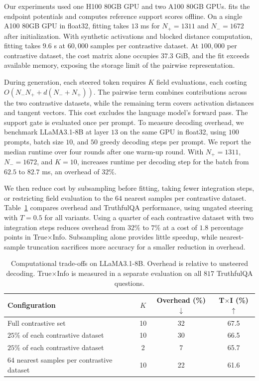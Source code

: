 Our experiments used one H100 80GB GPU and two A100 80GB GPUs. \Cobras fits the endpoint potentials and computes reference support scores offline. On a single A100 80GB GPU in float32, fitting takes $13$ ms for $N_+=1311$ and $N_-=1672$ after initialization. With synthetic activations and blocked distance computation, fitting takes $9.6$ s at $60{,}000$ samples per contrastive dataset. At $100{,}000$ per contrastive dataset, the cost matrix alone occupies $37.3$ GiB, and the fit exceeds available memory, exposing the storage limit of the pairwise representation.

During generation, each steered token requires $K$ field evaluations, each costing $O(N_-N_+ + d(N_-+N_+))$. The pairwise term combines contributions across the two contrastive datasets, while the remaining term covers activation distances and tangent vectors. This cost excludes the language model's forward pass. The support gate is evaluated once per prompt. To measure decoding overhead, we benchmark LLaMA3.1-8B at layer $13$ on the same GPU in float32, using $100$ prompts, batch size $10$, and $50$ greedy decoding steps per prompt. We report the median runtime over four rounds after one warm-up round. With $N_+=1311$, $N_-=1672$, and $K=10$, \Cobras increases runtime per decoding step for the batch from $62.5$ to $82.7$ ms, an overhead of $32\%$.

We then reduce cost by subsampling before fitting, taking fewer integration steps, or restricting field evaluation to the $64$ nearest samples per contrastive dataset. Table~\ref{tab:runtime-approximations} compares overhead and TruthfulQA performance, using ungated steering with $T=0.5$ for all variants. Using a quarter of each contrastive dataset with two integration steps reduces overhead from $32\%$ to $7\%$ at a cost of $1.8$ percentage points in True$\times$Info. Subsampling alone provides little speedup, while nearest-sample truncation sacrifices more accuracy for a smaller reduction in overhead.

\begin{table}[ht]
\centering
\small
\caption{Computational trade-offs on LLaMA3.1-8B. Overhead is relative to unsteered decoding. True$\times$Info is measured in a separate evaluation on all $817$ TruthfulQA questions.}
\label{tab:runtime-approximations}
\begin{tabular}{lccc}
\toprule
Configuration & $K$ & Overhead (\%)$\downarrow$ & T$\times$I (\%)$\uparrow$ \\
\midrule
Full contrastive set & 10 & 32 & 67.5 \\
$25\%$ of each contrastive dataset & 10 & 30 & 66.5 \\
$25\%$ of each contrastive dataset & 2 & 7 & 65.7 \\
$64$ nearest samples per contrastive dataset & 10 & 22 & 61.6 \\
\bottomrule
\end{tabular}
\end{table}

